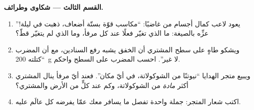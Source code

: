 \begin{problem}
\medskip\noindent\textbf{القسم الثالث --- شكاوى وطرائف.}
\begin{enumerate}[resume]
  \item يعود لاعب كمال أجسام من  غاضبًا: ``مكاسب قوّة
        بستّة أضعاف، ذهبت في ليلة!'' عزِّه بالصيغة: ما الذي
        تغيّر فعلًا عند كل مرفأ، وما الذي لم يتغيّر قطّ؟
  \item ويشكو طاهٍ على سطح المشتري أن الخفق يشبه رفع
        السنادين، مع أن المضرب ``كتلته \qty{200}{g} لا
        غير''. احسب  المضرب على السطح واحكم.
  \item ويبيع متجر الهدايا ``نيوتنًا من الشوكولاتة، في أيّ
        مكان''. فعند أيّ مرفأ ينال المشتري أكثر
        \emph{مادة} من الشوكولاتة، وكم  عند كلٍّ من
        الأرض  والمشتري؟
  \item اكتب شعار المتجر: جملة واحدة تفصل ما يسافر معك عمّا
        يفرضه كل عالَم عليه.
\end{enumerate}
\end{problem}
